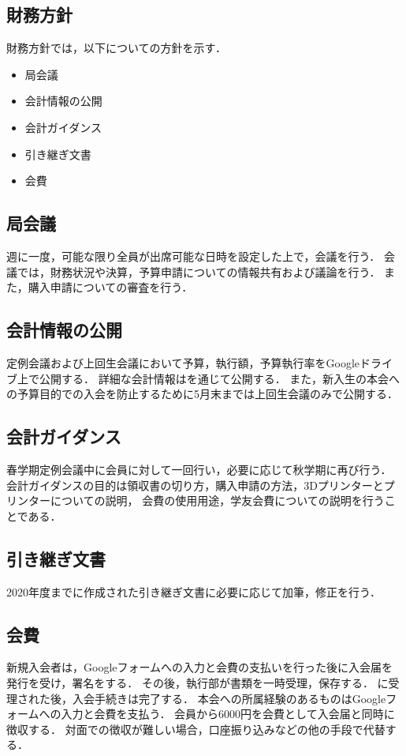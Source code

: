 \subsection*{財務方針}


財務方針では，以下についての方針を示す．
\begin{itemize}
  \item 局会議
  \item 会計情報の公開
  \item 会計ガイダンス
  \item 引き継ぎ文書
  \item 会費
\end{itemize}

\subsection*{局会議}
週に一度，可能な限り\kaikeiStaff{}全員が出席可能な日時を設定した上で，会議を行う．
会議では，財務状況や決算，予算申請についての情報共有および議論を行う．
また，購入申請についての審査を行う．

\subsection*{会計情報の公開}
定例会議および上回生会議において予算，執行額，予算執行率をGoogleドライブ上で公開する．
詳細な会計情報は\kaikeiStaff{}を通じて公開する．
また，新入生の本会への予算目的での入会を防止するために5月末までは上回生会議のみで公開する．

\subsection*{会計ガイダンス}
春学期定例会議中に会員に対して一回行い，必要に応じて秋学期に再び行う．
会計ガイダンスの目的は領収書の切り方，購入申請の方法，3Dプリンターとプリンターについての説明，
会費の使用用途，学友会費についての説明を行うことである．

\subsection*{引き継ぎ文書}
2020年度までに作成された引き継ぎ文書に必要に応じて加筆，修正を行う．

\subsection*{会費}
新規入会者は，Googleフォームへの入力と会費の支払いを行った後に入会届を発行を受け，署名をする．
その後，執行部が書類を一時受理，保存する．
\president{}に受理された後，入会手続きは完了する．
本会への所属経験のあるものはGoogleフォームへの入力と会費を支払う．
会員から6000円を会費として入会届と同時に徴収する．
対面での徴収が難しい場合，口座振り込みなどの他の手段で代替する．
